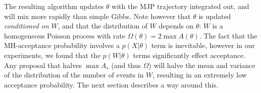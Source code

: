 \vspace{-.1in}
The resulting algorithm updates $\theta$ with the MJP trajectory integrated out, 
and will mix more rapidly than simple Gibbs. 
Note however that $\theta$ is updated {\em conditioned on
$W$}, and that
the distribution of $W$ depends on $\theta$: 
$W$ is a homogeneous
Poisson process with rate $\Omega(\theta) = 2 \max A(\theta)$. 
The fact that the MH-acceptance probability involves a $p(X|\theta)$ term
is inevitable, however in our experiments, we found that the $p(W|\theta)$
terms significantly effect acceptance. 
Any proposal that halves $\max A_s$ (and thus $\Omega$) will halve the
mean and variance of the distribution of the number of events in $W$, 
resulting in an extremely low acceptance probability.
The next section describes a way around this.

